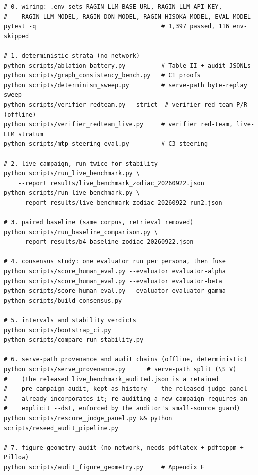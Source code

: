 \begin{lstlisting}[style=code,float=tb,caption={Full reproduction sequence. Each step writes the artifact that backs its section.},label={lst:repro}]
# 0. wiring: .env sets RAGIN_LLM_BASE_URL, RAGIN_LLM_API_KEY,
#    RAGIN_LLM_MODEL, RAGIN_DON_MODEL, RAGIN_HISOKA_MODEL, EVAL_MODEL
pytest -q                                   # 1,397 passed, 116 env-skipped

# 1. deterministic strata (no network)
python scripts/ablation_battery.py          # Table II + audit JSONLs
python scripts/graph_consistency_bench.py   # C1 proofs
python scripts/determinism_sweep.py         # serve-path byte-replay sweep
python scripts/verifier_redteam.py --strict  # verifier red-team P/R (offline)
python scripts/verifier_redteam_live.py     # verifier red-team, live-LLM stratum
python scripts/mtp_steering_eval.py         # C3 steering

# 2. live campaign, run twice for stability
python scripts/run_live_benchmark.py \
    --report results/live_benchmark_zodiac_20260922.json
python scripts/run_live_benchmark.py \
    --report results/live_benchmark_zodiac_20260922_run2.json

# 3. paired baseline (same corpus, retrieval removed)
python scripts/run_baseline_comparison.py \
    --report results/b4_baseline_zodiac_20260922.json

# 4. consensus study: one evaluator run per persona, then fuse
python scripts/score_human_eval.py --evaluator evaluator-alpha
python scripts/score_human_eval.py --evaluator evaluator-beta
python scripts/score_human_eval.py --evaluator evaluator-gamma
python scripts/build_consensus.py

# 5. intervals and stability verdicts
python scripts/bootstrap_ci.py
python scripts/compare_run_stability.py

# 6. serve-path provenance and audit chains (offline, deterministic)
python scripts/serve_provenance.py      # serve-path split (\S V)
#    (the released live_benchmark_audited.json is a retained
#    pre-campaign audit, kept as history -- the released judge panel
#    already incorporates it; re-auditing a new campaign requires an
#    explicit --dst, enforced by the auditor's small-source guard)
python scripts/rescore_judge_panel.py && python scripts/reseed_audit_pipeline.py

# 7. figure geometry audit (no network, needs pdflatex + pdftoppm + Pillow)
python scripts/audit_figure_geometry.py     # Appendix F
\end{lstlisting}

